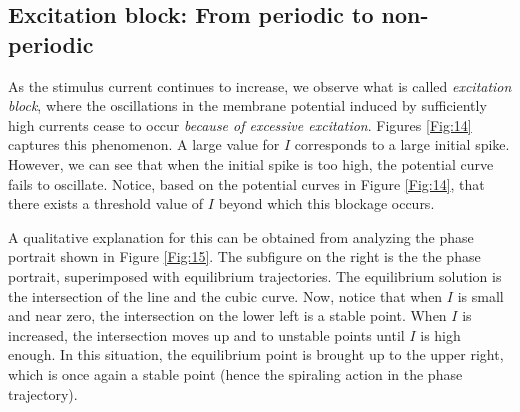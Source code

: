 \documentclass{book}
\theoremstyle{definition}
\begin{document}
\subsection{Excitation block: From periodic to non-periodic}

As the stimulus current continues to increase, we observe what is called \textit{excitation block}, where the oscillations in the membrane potential induced by sufficiently high currents cease to occur \textit{because of excessive excitation}. Figures \ref{Fig:14} captures this phenomenon. A large value for $I$ corresponds to a large initial spike. However, we can see that when the initial spike is too high, the potential curve fails to oscillate. Notice, based on the potential curves in Figure \ref{Fig:14}, that there exists a threshold value of $I$ beyond which this blockage occurs.

A qualitative explanation for this can be obtained from analyzing the phase portrait shown in Figure \ref{Fig:15}. The subfigure on the right is the the phase portrait, superimposed with equilibrium trajectories. The equilibrium solution is the intersection of the line and the cubic curve. Now, notice that when $I$ is small and near zero, the intersection on the lower left is a stable point. When $I$ is increased, the intersection moves up and to unstable points until $I$ is high enough. In this situation, the equilibrium point is brought up to the upper right, which is once again a stable point (hence the spiraling action in the phase trajectory).
\end{document}
